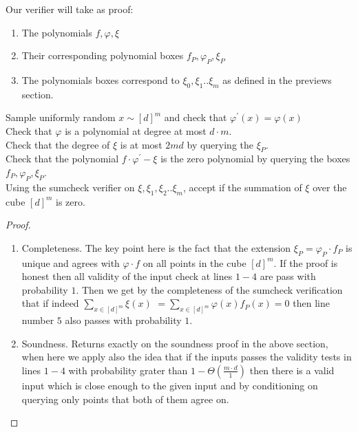 \documentclass{article}
\begin{document}
Our verifier will take as proof: 

\begin{enumerate}
  \item The polynomials $f,\varphi, \xi$ 
  \item Their corresponding polynomial boxes $f_{P},\varphi_{P}, \xi_{P}$ 
  \item The polynomials boxes correspond to $\xi_{0}, \xi_{1} .. \xi_{m}$ as defined in the previews section.  
\end{enumerate}

\begin{algorithm}[H]
  Sample uniformly random $x \sim  [d]^{m}$ and check that $\varphi^{\prime}\left( x \right) = \varphi\left( x \right)$   \\
  Check that $\varphi$ is a polynomial at degree at most $d\cdot m$. \\
  Check that the degree of $\xi$ is at most $2md$ by querying the $\xi_{P}$.\\ 
  Check that the polynomial $f\cdot \varphi^{\prime} - \xi$ is the zero polynomial by querying the boxes $f_{P},\varphi_{P},\xi_{P}$. \\
  Using the sumcheck verifier on $\xi, \xi_{1},\xi_{2} .. \xi_{m}$, accept if the summation of $\xi$ over the cube $[d]^{m}$ is zero.  
\end{algorithm}

\begin{proof} \ 


  \begin{enumerate}
    \item Completeness. The key point here is the fact that the extension $\xi_{P} = \varphi_{P} \cdot f_{P}$ is unique and agrees with $\varphi\cdot f$ on all points in the cube $[d]^{m}$. If the proof is honest then all validity of the input check at lines $1-4$ are pass with probability $1$. Then we get by the completeness of the sumcheck verification that if indeed $\sum_{x \in [d]^{m}}{ \xi(x) }$ $ = \sum_{x \in [d]^{m}}{ \varphi(x)f_{P}(x) } = 0$ then line number $5$ also passes with probability $1$. 
    \item Soundness. Returns exactly on the soundness proof in the above section, when here we apply also the idea that if the inputs passes the validity tests in lines $1-4$ with probability grater than $1-\Theta(\frac{m\cdot d}{1})$ then there is a valid input which is close enough to the given input and by conditioning on querying only points that both of them agree on.  
  \end{enumerate}
\end{proof}
\end{document}
